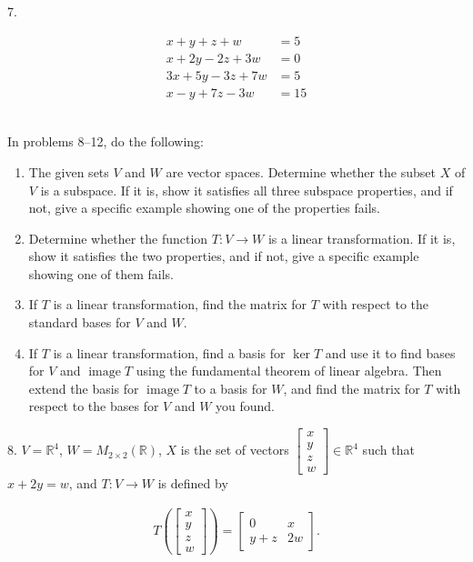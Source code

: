 \documentclass{article}
\begin{document}
7.

\begin{align*}
	x + y + z + w &= 5\\
	x + 2y - 2z + 3w &= 0\\
	3x + 5y - 3z + 7w &= 5\\
	x - y + 7z - 3w &= 15
\end{align*}

~\\

In problems 8--12, do the following:

\begin{enumerate}

	\item The given sets $V$ and $W$ are vector spaces. Determine whether the subset $X$ of $V$ is a subspace. If it is, show it satisfies all three subspace properties, and if not, give a specific example showing one of the properties fails.

	\item Determine whether the function $T : V \to W$ is a linear transformation. If it is, show it satisfies the two properties, and if not, give a specific example showing one of them fails.

	\item If $T$ is a linear transformation, find the matrix for $T$ with respect to the standard bases for $V$ and $W$.

	\item If $T$ is a linear transformation, find a basis for $\ker T$ and use it to find bases for $V$ and $\operatorname{image} T$ using the fundamental theorem of linear algebra. Then extend the basis for $\operatorname{image} T$ to a basis for $W$, and find the matrix for $T$ with respect to the bases for $V$ and $W$ you found.

\end{enumerate}

8. $V = \mathbb{R}^4$, $W = M_{2 \times 2}(\mathbb{R})$, $X$ is the set of vectors $\left[\begin{array}{c} x \\ y \\ z \\ w \end{array}\right] \in \mathbb{R}^4$ such that $x + 2y = w$, and $T : V \to W$ is defined by

\begin{align*}
	T\left( \left[\begin{array}{c} x \\ y \\ z \\ w \end{array}\right] \right) = \left[\begin{array}{cc} 0& x \\ y + z& 2w \end{array}\right].
\end{align*}
\end{document}

